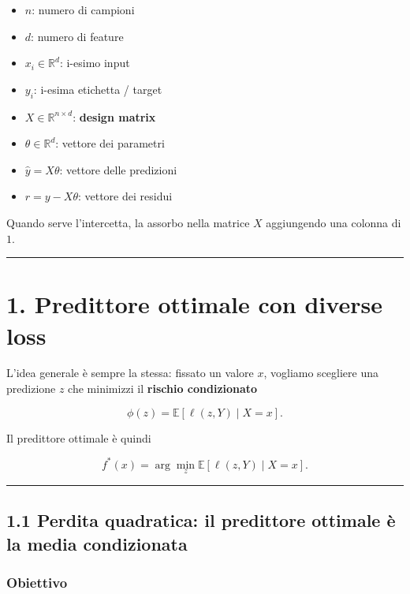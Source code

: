 \documentclass{article}
\providecommand{\tightlist}{%
  \setlength{\itemsep}{0pt}\setlength{\parskip}{0pt}}
\begin{document}
\begin{itemize}
\tightlist
\item
  \(n\): numero di campioni
\item
  \(d\): numero di feature
\item
  \(x_i \in \mathbb{R}^d\): i-esimo input
\item
  \(y_i\): i-esima etichetta / target
\item
  \(X \in \mathbb{R}^{n \times d}\): \textbf{design matrix}
\item
  \(\theta \in \mathbb{R}^d\): vettore dei parametri
\item
  \(\hat y = X\theta\): vettore delle predizioni
\item
  \(r = y - X\theta\): vettore dei residui
\end{itemize}

Quando serve l'intercetta, la assorbo nella matrice \(X\) aggiungendo
una colonna di \(1\).

\begin{center}\rule{0.5\linewidth}{0.5pt}\end{center}

\section{1. Predittore ottimale con diverse
loss}\label{predittore-ottimale-con-diverse-loss}

L'idea generale è sempre la stessa: fissato un valore \(x\), vogliamo
scegliere una predizione \(z\) che minimizzi il \textbf{rischio
condizionato}

\[
\phi(z) = \mathbb{E}[\ell(z,Y)\mid X=x].
\]

Il predittore ottimale è quindi

\[
f^*(x) = \arg\min_z \mathbb{E}[\ell(z,Y)\mid X=x].
\]

\begin{center}\rule{0.5\linewidth}{0.5pt}\end{center}

\subsection{1.1 Perdita quadratica: il predittore ottimale è la media
condizionata}\label{perdita-quadratica-il-predittore-ottimale-uxe8-la-media-condizionata}

\subsubsection{Obiettivo}\label{obiettivo}
\end{document}
